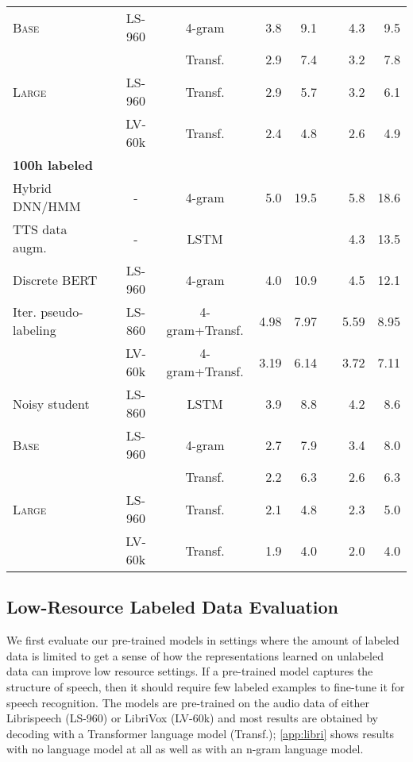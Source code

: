 \documentclass{article}
\newcommand{\wvppbase}{\textsc{Base}}
\newcommand{\wvppbig}{\textsc{Large}}
\newcommand{\vox}{LibriVox}
\newcommand{\libri}{Librispeech}
\newcommand{\voxsz}{LV-60k}
\newcommand{\librisz}{LS-960}
\newcommand{\libriunsz}{LS-860}
\begin{document}
\begin{table}[t]
\begin{tabular}{lccrrrrr}
\midrule
\wvppbase{} & \librisz{} & 4-gram & 3.8 & 9.1 && 4.3 & 9.5 \\
&& Transf. & 2.9 & 7.4 && 3.2 & 7.8 \\
\wvppbig{} & \librisz{} & Transf. & 2.9 & 5.7 && 3.2 & 6.1 \\
& \voxsz{} & Transf. & 2.4 & 4.8 && 2.6 & 4.9 \\
\midrule
\midrule
\multicolumn{8}{l}{\textbf{100h labeled}}\\
Hybrid DNN/HMM \citep{L_scher_2019} & - & 4-gram & 5.0 & 19.5 && 5.8 & 18.6 \\
TTS data augm.~\citep{aleks2020need} & - & LSTM & & && 4.3 & 13.5 \\
Discrete BERT~\citep{baevski2019effectiveness} & \librisz{} & 4-gram & 4.0 & 10.9 && 4.5 & 12.1 \\
Iter. pseudo-labeling~\cite{xu2020iterative} & \libriunsz{} & 4-gram+Transf. & 4.98 & 7.97 && 5.59 & 8.95 \\
& \voxsz{} & 4-gram+Transf. & 3.19 & 6.14 && 3.72 & 7.11 \\
Noisy student~\citep{park2020improved} & \libriunsz{} & LSTM & 3.9 & 8.8 && 4.2 & 8.6 \\
\midrule
\wvppbase{} & \librisz{} & 4-gram & 2.7 & 7.9 && 3.4 & 8.0 \\
&& Transf. & 2.2 & 6.3 && 2.6 & 6.3 \\
\wvppbig{} & \librisz{} & Transf. & 2.1 & 4.8 && 2.3 & 5.0 \\
& \voxsz{} & Transf. & 1.9 & 4.0 && 2.0 & 4.0 \\
\bottomrule
\end{tabular}
\end{table}


\subsection{Low-Resource Labeled Data Evaluation}

We first evaluate our pre-trained models in settings where the amount of labeled data is limited to get a sense of how the representations learned on unlabeled data can improve low resource settings.
If a pre-trained model captures the structure of speech, then it should require few labeled examples to fine-tune it for speech recognition.
The models are pre-trained on the audio data of either \libri{} (\librisz{}) or \vox{} (\voxsz{}) and most results are obtained by decoding with a Transformer language model (Transf.); \autoref{app:libri} shows results with no language model at all as well as with an n-gram language model.
\end{document}
